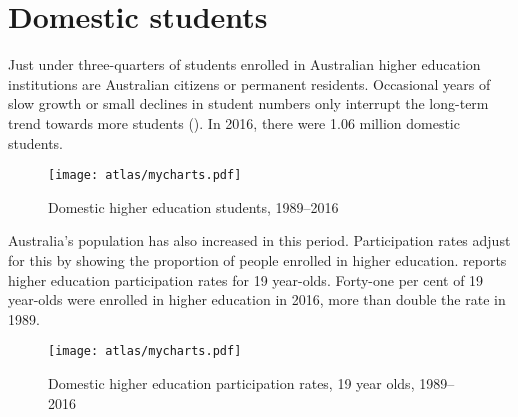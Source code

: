 \documentclass{grattan}
\begin{document}
%
\section{Domestic students }\label{sec:domestic-students}

Just under three-quarters of students enrolled in Australian higher education institutions are Australian citizens or permanent residents. Occasional years of slow growth or small declines in student numbers only interrupt the long-term trend towards more students (). In 2016, there were 1.06 million domestic students.


    \begin{figure} %
    \caption{Domestic higher education students, 1989--2016}\label{fig:domestic-higher-education-students-19892016}
    \texttt{[image: atlas/mycharts.pdf]}
    \end{figure}



Australia's population has also increased in this period. Participation rates adjust for this by showing the proportion of people enrolled in higher education.  reports higher education participation rates for 19 year-olds. Forty-one per cent of 19 year-olds were enrolled in higher education in 2016, more than double the rate in 1989.


    \begin{figure} %
    \caption{Domestic higher education participation rates, 19 year olds, 1989--2016}\label{fig:domestic-higher-education-participation-rates-19-year-olds-19892016}
    \texttt{[image: atlas/mycharts.pdf]}
    \end{figure}
\end{document}
